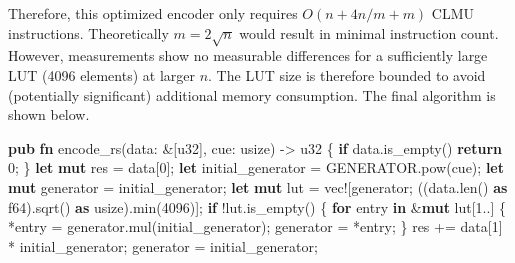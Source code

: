 \documentclass[
]{article}
\newenvironment{Shaded}{}{}
\newcommand{\DataTypeTok}[1]{\textcolor[rgb]{0.56,0.13,0.00}{#1}}
\newcommand{\DecValTok}[1]{\textcolor[rgb]{0.25,0.63,0.44}{#1}}
\newcommand{\KeywordTok}[1]{\textcolor[rgb]{0.00,0.44,0.13}{\textbf{#1}}}
\newcommand{\NormalTok}[1]{#1}
\newcommand{\OperatorTok}[1]{\textcolor[rgb]{0.40,0.40,0.40}{#1}}
\newcommand{\PreprocessorTok}[1]{\textcolor[rgb]{0.74,0.48,0.00}{#1}}
\begin{document}
Therefore, this optimized encoder only requires \(O(n + 4 n/m + m)\)
CLMU instructions. Theoretically \(m = 2\sqrt{n}\) would result in
minimal instruction count. However, measurements show no measurable
differences for a sufficiently large LUT (4096 elements) at larger
\(n\). The LUT size is therefore bounded to avoid (potentially
significant) additional memory consumption. The final algorithm is shown
below.
\newpage

\begin{Shaded}
\begin{Highlighting}[]
\KeywordTok{pub} \KeywordTok{fn}\NormalTok{ encode\_rs(data}\OperatorTok{:} \OperatorTok{\&}\NormalTok{[}\DataTypeTok{u32}\NormalTok{]}\OperatorTok{,}\NormalTok{ cue}\OperatorTok{:} \DataTypeTok{usize}\NormalTok{) }\OperatorTok{{-}\textgreater{}}\NormalTok{ u32 }\OperatorTok{\{}
    \KeywordTok{if}\NormalTok{ data}\OperatorTok{.}\NormalTok{is\_empty() }\OperatorToak{\{}
        \KeywordTok{return}\DecValTok{ 0}\OperatorTok{;}
    \OperatorTok{\}}
    \KeywordTok{let} \KeywordTok{mut}\NormalTok{ res }\OperatorTok{=}\NormalTok{ data[}\DecValTok{0}\NormalTok{]}\OperatorTok{;}
    \KeywordTok{let}\NormalTok{ initial\_generator }\OperatorTok{=} \NormalTok{GENERATOR}\OperatorTok{.}\NormalTok{pow(cue)}\OperatorTok{;}
    \KeywordTok{let} \KeywordTok{mut}\NormalTok{ generator }\OperatorTok{=}\NormalTok{ initial\_generator}\OperatorTok{;}
    \KeywordTok{let} \KeywordTok{mut}\NormalTok{ lut }\OperatorTok{=} \PreprocessorTok{vec!}\NormalTok{[generator}\OperatorTok{;}\NormalTok{ ((data}\OperatorTok{.}\NormalTok{len() }\KeywordTok{as} \DataTypeTok{f64}\NormalTok{)}\OperatorTok{.}\NormalTok{sqrt() }\KeywordTok{as} \DataTypeTok{usize}\NormalTok{)}\OperatorTok{.}\NormalTok{min(}\DecValTok{4096}\NormalTok{)}\NormalTok{]}\OperatorTok{;}
    \KeywordTok{if} \OperatorTok{!}\NormalTok{lut}\OperatorTok{.}\NormalTok{is\_empty() }\OperatorTok{\{}
        \KeywordTok{for}\NormalTok{ entry }\KeywordTok{in} \OperatorTok{\&}\KeywordTok{mut}\NormalTok{ lut[}\DecValTok{1}\OperatorTok{..}\NormalTok{] }\OperatorTok{\{}
            \OperatorTok{*}\NormalTok{entry }\OperatorTok{=}\NormalTok{ generator}\OperatorTok{.}\NormalTok{mul(initial\_generator)}\OperatorTok{;}
\NormalTok{            generator }\OperatorTok{=} \OperatorTok{*}\NormalTok{entry}\OperatorTok{;}
        \OperatorTok{\}}
\NormalTok{        res }\OperatorTok{+=}\NormalTok{ data[}\DecValTok{1}\NormalTok{] }\OperatorTok{*}\NormalTok{ initial\_generator}\OperatorTok{;}
\NormalTok{        generator }\OperatorTok{=}\NormalTok{ initial\_generator}\OperatorTok{;}

\end{Highlighting}
\end{Shaded}
\end{document}
